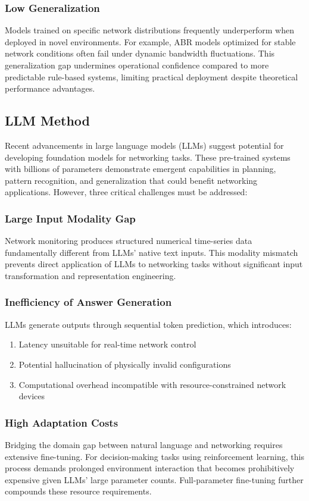\documentclass[twocolumn]{article}
\begin{document}
\subsubsection{Low Generalization}
Models trained on specific network distributions frequently underperform when deployed in novel environments. For example, ABR models optimized for stable network conditions often fail under dynamic bandwidth fluctuations. This generalization gap undermines operational confidence compared to more predictable rule-based systems, limiting practical deployment despite theoretical performance advantages.

\subsection{LLM Method}
Recent advancements in large language models (LLMs) suggest potential for developing foundation models for networking tasks. These pre-trained systems with billions of parameters demonstrate emergent capabilities in planning, pattern recognition, and generalization that could benefit networking applications. However, three critical challenges must be addressed:

\subsubsection{Large Input Modality Gap}
Network monitoring produces structured numerical time-series data fundamentally different from LLMs' native text inputs. This modality mismatch prevents direct application of LLMs to networking tasks without significant input transformation and representation engineering.

\subsubsection{Inefficiency of Answer Generation}
LLMs generate outputs through sequential token prediction, which introduces:
\begin{enumerate}[itemsep=0pt, topsep=2pt, parsep=0pt]
  \item Latency unsuitable for real-time network control
  \item Potential hallucination of physically invalid configurations
  \item Computational overhead incompatible with resource-constrained network devices
\end{enumerate}

\subsubsection{High Adaptation Costs}
Bridging the domain gap between natural language and networking requires extensive fine-tuning. For decision-making tasks using reinforcement learning, this process demands prolonged environment interaction that becomes prohibitively expensive given LLMs' large parameter counts. Full-parameter fine-tuning further compounds these resource requirements.
\end{document}
